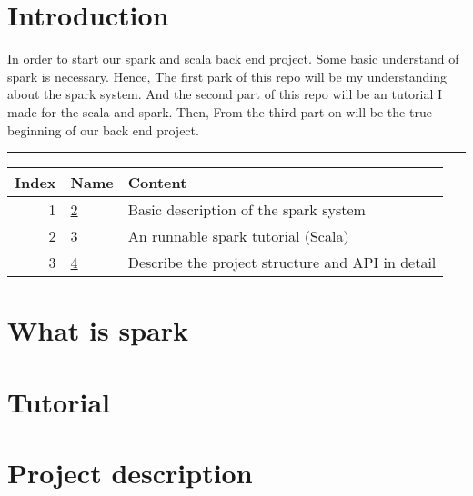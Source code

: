 \documentclass[11pt]{article}
\author{Cha Chen}
\date{\today}
\title{}
\begin{document}
\tableofcontents

\section{Introduction}
\label{sec:orgheadline4}
In order to start our spark and scala back end project. Some basic understand of spark is necessary. Hence, The first park of this repo will be my understanding about the spark system. And the second part of this repo will be an tutorial I made for the scala and spark. Then, From the third part on will be the true beginning of our back end project.

\rule{\linewidth}{0.5pt}
\begin{center}
\begin{tabular}{rll}
Index & Name & Content\\
\hline
1 & \ref{sec:orgheadline1} & Basic description of the spark system\\
2 & \ref{sec:orgheadline2} & An runnable spark tutorial (Scala)\\
3 & \ref{sec:orgheadline3} & Describe the project structure and API in detail\\
\end{tabular}
\end{center}
\section{What is spark}
\label{sec:orgheadline1}
\section{Tutorial}
\label{sec:orgheadline2}
\section{Project description}
\label{sec:orgheadline3}
\end{document}

